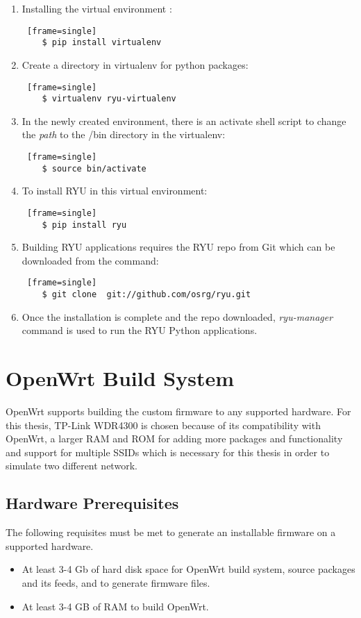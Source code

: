 \begin{enumerate}
	\item Installing the virtual environment :
	\begin{lstlisting} [frame=single]
	$ pip install virtualenv
	\end{lstlisting} 
	\item Create a directory in virtualenv for python packages: 
	\begin{lstlisting} [frame=single]
	$ virtualenv ryu-virtualenv
	\end{lstlisting}
	\item In the newly created environment, there is an activate shell script to change the \textit{path} to the /bin directory in the virtualenv: 
	\begin{lstlisting} [frame=single]
	$ source bin/activate
	\end{lstlisting}
	\item To install RYU in this virtual environment:
	\begin{lstlisting} [frame=single]
	$ pip install ryu
	\end{lstlisting}
	\item Building RYU applications requires the RYU repo from Git which can be downloaded from the command:
	\begin{lstlisting} [frame=single]
	$ git clone  git://github.com/osrg/ryu.git
	\end{lstlisting}
	\item Once the installation is complete and the repo downloaded, \textit{ryu-manager} command is used to run the RYU Python applications.
\end{enumerate}

\section{OpenWrt Build System \cite{OpenWrt_build_root}} \label{OpenWrt_build}
OpenWrt supports building the custom firmware to any supported hardware. For this thesis, TP-Link WDR4300 is chosen because of its compatibility with OpenWrt, a larger RAM and ROM for adding more packages and functionality and support for multiple SSIDs which is necessary for this thesis in order to simulate two different network.
\subsection{Hardware Prerequisites}
The following requisites must be met to generate an installable firmware on a supported hardware.
\begin{itemize}
	\item At least 3-4 Gb of hard disk space for OpenWrt build system, source packages and its feeds, and to generate firmware files.
	\item At least 3-4 GB of RAM to build OpenWrt.
\end{itemize}
